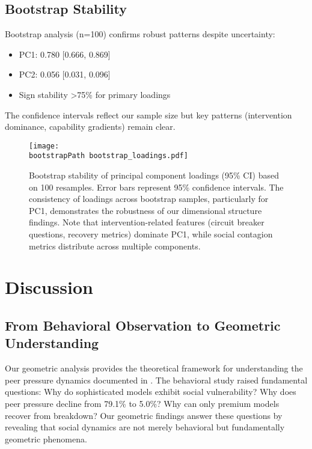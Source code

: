 \documentclass[11pt,letterpaper]{article}
\newcommand{\pcOneVarianceMean}{0.780}
\newcommand{\pcOneVarianceCI}{[0.666, 0.869]}
\newcommand{\pcTwoVarianceMean}{0.056}
\newcommand{\pcTwoVarianceCI}{[0.031, 0.096]}
\newcommand{\bootstrapSamples}{100}
\newcommand{\fullReasoningPeerPressure}{79.1\%}
\newcommand{\nonReasoningPeerPressure}{5.0\%}
\newcommand{\bootstrapPath}{../analysis/analysis_outputs/bootstrap/}
\begin{document}
\subsection{Bootstrap Stability}

Bootstrap analysis (n=\bootstrapSamples{}) confirms robust patterns despite uncertainty:

\begin{itemize}
    \item PC1: \pcOneVarianceMean{} \pcOneVarianceCI{}
    \item PC2: \pcTwoVarianceMean{} \pcTwoVarianceCI{}
    \item Sign stability >75\% for primary loadings
\end{itemize}

The confidence intervals reflect our sample size but key patterns (intervention dominance, capability gradients) remain clear.

\begin{figure}[htbp]
\centering
\texttt{[image: \\bootstrapPath bootstrap\_loadings.pdf]}
\caption{Bootstrap stability of principal component loadings (95\% CI) based on \bootstrapSamples{} resamples. Error bars represent 95\% confidence intervals. The consistency of loadings across bootstrap samples, particularly for PC1, demonstrates the robustness of our dimensional structure findings. Note that intervention-related features (circuit breaker questions, recovery metrics) dominate PC1, while social contagion metrics distribute across multiple components.}
\label{fig:bootstrap_loadings}
\end{figure}

\section{Discussion}

\subsection{From Behavioral Observation to Geometric Understanding}

Our geometric analysis provides the theoretical framework for understanding the peer pressure dynamics documented in \citep{garcia2025peer}. The behavioral study raised fundamental questions: Why do sophisticated models exhibit social vulnerability? Why does peer pressure decline from \fullReasoningPeerPressure{} to \nonReasoningPeerPressure{}? Why can only premium models recover from breakdown? Our geometric findings answer these questions by revealing that social dynamics are not merely behavioral but fundamentally geometric phenomena.
\end{document}
